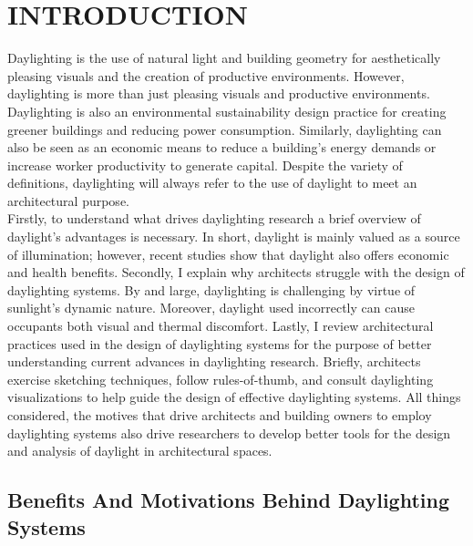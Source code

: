 
\chapter{INTRODUCTION} \label{sec:introduction}
Daylighting is the use of natural light and building geometry for aesthetically pleasing visuals and the creation of productive environments.  However, daylighting is more than just pleasing visuals and productive environments. Daylighting is also an environmental sustainability design practice for creating greener buildings and reducing power consumption.  Similarly, daylighting can also be seen as an  economic means to reduce a building's energy demands or increase worker productivity to generate capital. Despite the variety of definitions, daylighting will always refer to the use of daylight to meet an architectural purpose.  
\\

Firstly, to understand what drives daylighting research a brief overview of daylight's advantages is necessary.  In short, daylight is mainly valued as a source of illumination; however, recent studies show that daylight also offers economic and health benefits.  Secondly, I explain why architects struggle with the design of daylighting systems.  By and large, daylighting is challenging by virtue of sunlight's dynamic nature.  Moreover, daylight used incorrectly can cause occupants both visual and thermal discomfort.  Lastly, I review architectural practices used in the design of daylighting systems for the purpose of better understanding current advances in daylighting research.  Briefly, architects exercise sketching techniques, follow rules-of-thumb, and consult daylighting visualizations to help guide the design of effective daylighting systems. All things considered, the motives that drive architects and building owners to employ daylighting systems also drive researchers to develop better tools for the design and analysis of daylight in architectural spaces.
\\

\section{Benefits And Motivations Behind Daylighting Systems}
    
